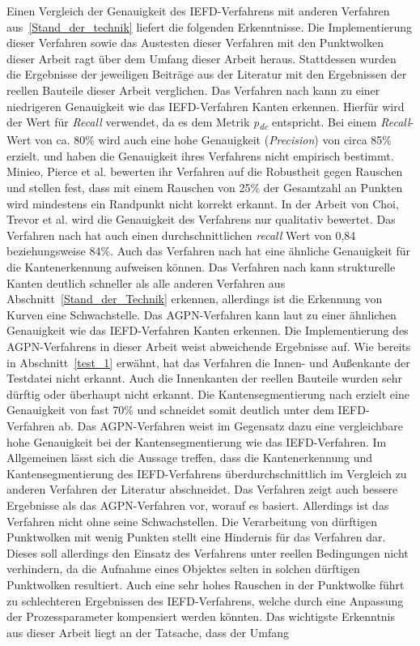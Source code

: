 Einen Vergleich der Genauigkeit des IEFD-Verfahrens mit anderen Verfahren aus~\ref{Stand_der_technik} liefert die folgenden Erkenntnisse. Die Implementierung dieser Verfahren sowie das Austesten dieser Verfahren mit den Punktwolken dieser Arbeit ragt über dem Umfang dieser Arbeit heraus. Stattdessen wurden die Ergebnisse der jeweiligen Beiträge aus der Literatur mit den Ergebnissen der reellen Bauteile dieser Arbeit verglichen. Das Verfahren nach \textcite[7353]{ahmed_edge_2018} kann zu einer niedrigeren Genauigkeit wie das IEFD-Verfahren Kanten erkennen. Hierfür wird der Wert für \textit{Recall} verwendet, da es dem Metrik \textit{p\textsubscript{dc}} entspricht. Bei einem \textit{Recall}-Wert von ca. 80\% wird auch eine hohe Genauigkeit (\textit{Precision}) von circa 85\% erzielt. \textcite[88]{mineo_novel_2019} und \textcite{choi_rgb-d_2013} haben die Genauigkeit ihres Verfahrens nicht empirisch bestimmt. Minieo, Pierce et al. bewerten ihr Verfahren auf die Robustheit gegen Rauschen und stellen fest, dass mit einem Rauschen von 25\% der Gesamtzahl an Punkten wird mindestens ein Randpunkt nicht korrekt erkannt. In der Arbeit von Choi, Trevor et al. wird die Genauigkeit des Verfahrens nur qualitativ bewertet. Das Verfahren nach \textcite[11]{bazazian_edc-net_2021} hat auch einen durchschnittlichen \textit{recall} Wert von 0,84 beziehungsweise 84\%. Auch das Verfahren nach \textcite[9]{himeur_pcednet_2021} hat eine ähnliche Genauigkeit für die Kantenerkennung aufweisen können. Das Verfahren nach \textcite{lu_fast_2019} kann strukturelle Kanten deutlich schneller als alle anderen Verfahren aus Abschnitt~\ref{Stand_der_Technik} erkennen, allerdings ist die Erkennung von Kurven eine Schwachstelle. Das AGPN-Verfahren kann laut \textcite{ni_edge_2016} zu einer ähnlichen Genauigkeit wie das IEFD-Verfahren Kanten erkennen. Die Implementierung des AGPN-Verfahrens in dieser Arbeit weist abweichende Ergebnisse auf. Wie bereits in Abschnitt~\ref{test_1} erwähnt, hat das Verfahren die Innen- und Außenkante der Testdatei nicht erkannt. Auch die Innenkanten der reellen Bauteile wurden sehr dürftig oder überhaupt nicht erkannt. Die Kantensegmentierung nach \textcite[234]{hu_jsenet_2020} erzielt eine Genauigkeit von fast 70\% und schneidet somit deutlich unter dem IEFD-Verfahren ab. Das AGPN-Verfahren weist im Gegensatz dazu eine vergleichbare hohe Genauigkeit bei der Kantensegmentierung wie das IEFD-Verfahren. Im Allgemeinen lässt sich die Aussage treffen, dass die Kantenerkennung und Kantensegmentierung des IEFD-Verfahrens überdurchschnittlich im Vergleich zu anderen Verfahren der Literatur abschneidet. Das Verfahren zeigt auch bessere Ergebnisse als das AGPN-Verfahren vor, worauf es basiert. Allerdings ist das Verfahren nicht ohne seine Schwachstellen. Die Verarbeitung von dürftigen Punktwolken mit wenig Punkten stellt eine Hindernis für das Verfahren dar. Dieses soll allerdings den Einsatz des Verfahrens unter reellen Bedingungen nicht verhindern, da die Aufnahme eines Objektes selten in solchen dürftigen Punktwolken resultiert. Auch eine sehr hohes Rauschen in der Punktwolke führt zu schlechteren Ergebnissen des IEFD-Verfahrens, welche durch eine Anpassung der Prozessparameter kompensiert werden könnten. Das wichtigste Erkenntnis aus dieser Arbeit liegt an der Tatsache, dass der Umfang 